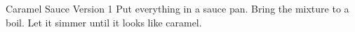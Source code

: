 \documentclass[../cookbook.tex]{subfiles}
\begin{document}
\begin{recipe}{Caramel Sauce Version 1}{}{}
    Put everything in a sauce pan. Bring the mixture to a boil.
    Let it simmer until it looks like caramel.
\end{recipe}
\end{document}
